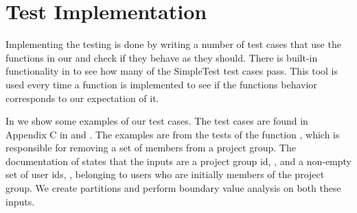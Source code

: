 \section{Test Implementation}
\label{sec:testimplementation}
\newcommand{\vargroupid}{\vari{group\_id}}
\newcommand{\varuserids}{\vari{users}}
Implementing the testing is done by writing a number of test cases that use the functions in our \subsystem{} and check if they behave as they should.
There is built-in functionality in \moodle{} to see how many of the SimpleTest test cases pass.
This tool is used every time a function is implemented to see if the functions behavior corresponds to our expectation of it.

In  we show some examples of our test cases.
The test cases are found in Appendix C in  and .
The examples are from the tests of the function , which is responsible for removing a set of members from a project group.
The documentation of  states that the inputs are a project group id, \vargroupid{}, and a non-empty set of user ids, \varuserids{}, belonging to users who are initially members of the project group.
We create partitions and perform boundary value analysis on both these inputs.

